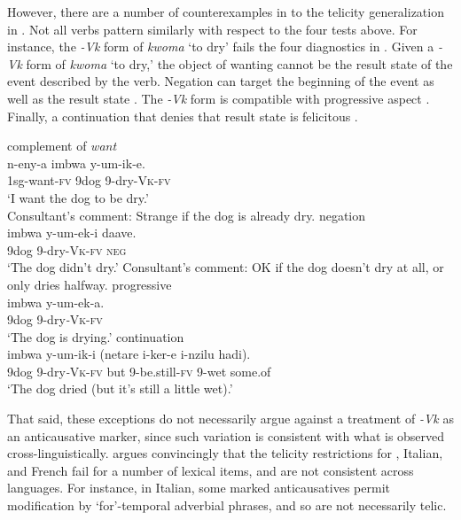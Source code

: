 \documentclass[output=paper]{langsci/lanmgscibook}
\begin{document}
However, there are a number of counterexamples in  to the telicity generalization in . Not all verbs pattern similarly with respect to the four tests above. For instance, the \textit{-Vk} form of \textit{kwoma} ‘to dry’ fails the four diagnostics in . Given a \textit{-Vk} form of \textit{kwoma} ‘to dry,’ the object of wanting cannot be the result state  of the event described by the verb. Negation can target the beginning of the event as well as the result state . The \textit{-Vk} form is compatible with progressive aspect . Finally, a continuation that denies that result state is felicitous .

\ea\label{ex:gluckman:16} 
  \ea\label{ex:gluckman:16a}
  {{complement of} {\textit{want}}}\\
  \gll n-eny-a          imbwa y-um-ik-e.\\
      1sg-want-\textsc{fv} 9dog    9-dry-\textsc{Vk}-\textsc{fv}\\
  \glt ‘I want the dog to be dry.’\\
  \glt Consultant’s comment: Strange if the dog is already dry.
  \ex\label{ex:gluckman:16b}
  {{negation}}\\
  \gll imbwa y-um-ek-i     daave.\\
      9dog    9-dry-\textsc{Vk}-\textsc{fv} \textsc{neg}\\
  \glt ‘The dog didn’t dry.’
  \glt Consultant’s comment: OK if the dog doesn’t dry at all, or only dries halfway.
  \ex\label{ex:gluckman:16c}
  {{progressive}}\\
  \gll imbwa y-um-ek-a.\\
      9dog   9-dry\textit{-}\textsc{Vk}-\textsc{fv}\\
  \glt ‘The dog is drying.’
  \ex\label{ex:gluckman:16d}
  {{continuation}}\\
  \gll imbwa y-um-ik-i      (netare i-ker-e         i-nzilu hadi).\\
      9dog   9-dry\textit{-}\textsc{Vk}-\textsc{fv} but       9-be.still-\textsc{fv} 9-wet some.of\\
  \glt ‘The dog dried (but it’s still a little wet).’
  \z
\z

That said, these exceptions do not necessarily argue against a treatment of \textit{-Vk} as an anticausative marker, since such variation is consistent with what is observed cross-linguistically. \citet{Schäfer2008} argues convincingly that the telicity restrictions for , Italian, and French fail for a number of lexical items, and are not consistent across languages. For instance, in Italian, some marked anticausatives permit modification by ‘for’-temporal adverbial phrases, and so are not necessarily telic.
\end{document}
